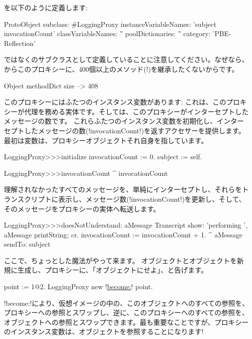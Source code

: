 \documentclass[a4paper,10pt,twoside]{book}
\begin{document}
を以下のように定義します:
\begin{code}{}
ProtoObject subclass: #LoggingProxy
	instanceVariableNames: 'subject invocationCount'
	classVariableNames: ''
	poolDictionaries: ''
	category: 'PBE-Reflection'
\end{code}
ではなくのサブクラスとして定義していることに注意してください。なぜなら、からこのプロキシーに、400個以上のメソッド(!)を継承したくないからです。

\begin{code}{}
Object methodDict size --> 408
\end{code}

このプロキシーにはふたつのインスタンス変数があります:  これは、このプロキシーが代理を務める実体です。そしては、このプロキシーがインターセプトしたメッセージの数です。
これらふたつのインスタンス変数を初期化し、インターセプトしたメッセージの数(\ct!invocationCount!)を返すアクセサーを提供します。
最初は変数は、プロキシーオブジェクトそれ自身を指しています。
\begin{code}{}
LoggingProxy>>>initialize
	invocationCount := 0.
	subject := self.
\end{code}

\begin{code}{}
LoggingProxy>>>invocationCount
	^ invocationCount
\end{code}

理解されなかったすべてのメッセージを、単純にインターセプトし、それらをトランスクリプトに表示し、メッセージ数(\ct!invocationCount!)を更新し、そして、そのメッセージをプロキシーの実体へ転送します。
\begin{code}{}
LoggingProxy>>>doesNotUnderstand: aMessage 
	Transcript show: 'performing ', aMessage printString; cr.
	invocationCount := invocationCount + 1.
	^ aMessage sendTo: subject
\end{code}

ここで、ちょっとした魔法がやって来ます。
オブジェクトとオブジェクトを新規に生成し、プロキシーに、「オブジェクトにせよ」、と告げます。
\begin{code}{}
point := 1@2.
LoggingProxy new !\underline{become:}! point.
\end{code}

\ct!become:!により、仮想イメージの中の、このオブジェクトへのすべての参照を、プロキシーへの参照とスワップし、逆に、このプロキシーへのすべての参照を、オブジェクトへの参照とスワップできます。最も重要なことですが、プロキシーのインスタンス変数は、オブジェクトを参照することになります!
\end{document}
